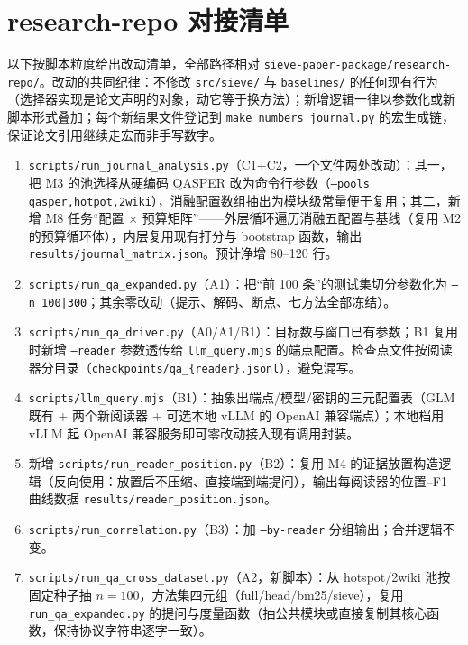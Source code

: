 \section{research-repo 对接清单}

以下按脚本粒度给出改动清单，全部路径相对 \texttt{sieve-paper-package/research-repo/}。改动的共同纪律：不修改 \texttt{src/sieve/} 与 \texttt{baselines/} 的任何现有行为（选择器实现是论文声明的对象，动它等于换方法）；新增逻辑一律以参数化或新脚本形式叠加；每个新结果文件登记到 \texttt{make\_numbers\_journal.py} 的宏生成链，保证论文引用继续走宏而非手写数字。

\begin{enumerate}[itemsep=2pt]

\item \texttt{scripts/run\_journal\_analysis.py}（C1+C2，一个文件两处改动）：其一，把 M3 的池选择从硬编码 QASPER 改为命令行参数（\texttt{--pools qasper,hotpot,2wiki}），消融配置数组抽出为模块级常量便于复用；其二，新增 M8 任务``配置 $\times$ 预算矩阵''——外层循环遍历消融五配置与基线（复用 M2 的预算循环体），内层复用现有打分与 bootstrap 函数，输出 \texttt{results/journal\_matrix.json}。预计净增 80--120 行。

\item \texttt{scripts/run\_qa\_expanded.py}（A1）：把``前 100 条''的测试集切分参数化为 \texttt{--n 100|300}；其余零改动（提示、解码、断点、七方法全部冻结）。

\item \texttt{scripts/run\_qa\_driver.py}（A0/A1/B1）：目标数与窗口已有参数；B1 复用时新增 \texttt{--reader} 参数透传给 \texttt{llm\_query.mjs} 的端点配置。检查点文件按阅读器分目录（\texttt{checkpoints/qa\_\{reader\}.jsonl}），避免混写。

\item \texttt{scripts/llm\_query.mjs}（B1）：抽象出端点/模型/密钥的三元配置表（GLM 既有 + 两个新阅读器 + 可选本地 vLLM 的 OpenAI 兼容端点）；本地档用 vLLM 起 OpenAI 兼容服务即可零改动接入现有调用封装。

\item 新增 \texttt{scripts/run\_reader\_position.py}（B2）：复用 M4 的证据放置构造逻辑（反向使用：放置后不压缩、直接端到端提问），输出每阅读器的位置--F1 曲线数据 \texttt{results/reader\_position.json}。

\item \texttt{scripts/run\_correlation.py}（B3）：加 \texttt{--by-reader} 分组输出；合并逻辑不变。

\item \texttt{scripts/run\_qa\_cross\_dataset.py}（A2，新脚本）：从 hotspot/2wiki 池按固定种子抽 $n{=}100$，方法集四元组（full/head/bm25/sieve），复用 \texttt{run\_qa\_expanded.py} 的提问与度量函数（抽公共模块或直接复制其核心函数，保持协议字符串逐字一致）。


\end{enumerate}
